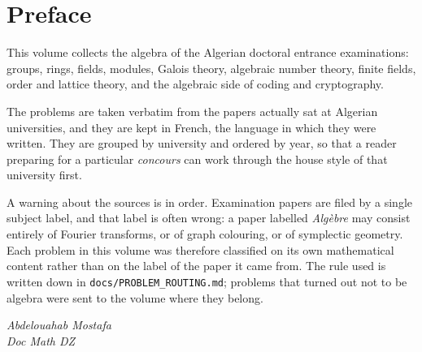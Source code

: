 \documentclass[print]{docmathdz}
\begin{document}
\chapter*{Preface}

This volume collects the algebra of the Algerian doctoral entrance examinations:
groups, rings, fields, modules, Galois theory, algebraic number theory, finite
fields, order and lattice theory, and the algebraic side of coding and
cryptography.

The problems are taken verbatim from the papers actually sat at Algerian
universities, and they are kept in French, the language in which they were
written. They are grouped by university and ordered by year, so that a reader
preparing for a particular \emph{concours} can work through the house style of
that university first.

A warning about the sources is in order. Examination papers are filed by a single
subject label, and that label is often wrong: a paper labelled \emph{Algèbre} may
consist entirely of Fourier transforms, or of graph colouring, or of symplectic
geometry. Each problem in this volume was therefore classified on its own
mathematical content rather than on the label of the paper it came from. The rule
used is written down in \texttt{docs/PROBLEM\_ROUTING.md}; problems that turned
out not to be algebra were sent to the volume where they belong.

\bigskip\noindent\emph{Abdelouahab Mostafa}\\
\emph{Doc Math DZ}

\mainmatter




\backmatter
\printbibliography[heading=bibintoc,title={References}]
\printindex
\end{document}
